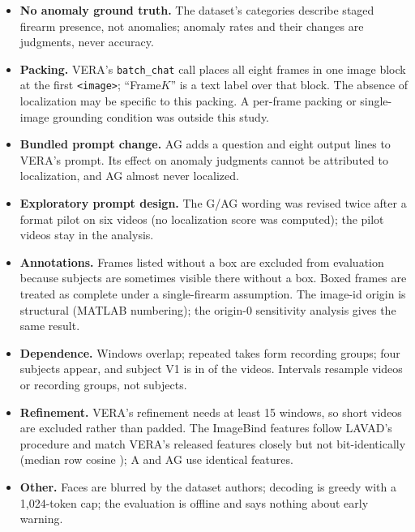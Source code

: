 \begin{itemize}
\item \textbf{No anomaly ground truth.} The dataset's categories describe staged firearm presence, not anomalies; anomaly rates and their changes are judgments, never accuracy.
\item \textbf{Packing.} VERA's \texttt{batch\_chat} call places all eight frames in one image block at the first \texttt{<image>}; ``Frame$K$'' is a text label over that block. The absence of localization may be specific to this packing. A per-frame packing or single-image grounding condition was outside this study.
\item \textbf{Bundled prompt change.} AG adds a question and eight output lines to VERA's prompt. Its effect on anomaly judgments cannot be attributed to localization, and AG almost never localized.
\item \textbf{Exploratory prompt design.} The G/AG wording was revised twice after a format pilot on six videos (no localization score was computed); the pilot videos stay in the analysis.
\item \textbf{Annotations.} Frames listed without a box are excluded from evaluation because subjects are sometimes visible there without a box. Boxed frames are treated as complete under a single-firearm assumption. The image-id origin is structural (MATLAB numbering); the origin-0 sensitivity analysis gives the same result.
\item \textbf{Dependence.} Windows overlap; repeated takes form recording groups; four subjects appear, and subject V1 is in  of the  videos. Intervals resample videos or recording groups, not subjects.
\item \textbf{Refinement.} VERA's refinement needs at least 15 windows, so short videos are excluded rather than padded. The ImageBind features follow LAVAD's procedure and match VERA's released features closely but not bit-identically (median row cosine ); A and AG use identical features.
\item \textbf{Other.} Faces are blurred by the dataset authors; decoding is greedy with a 1,024-token cap; the evaluation is offline and says nothing about early warning.
\end{itemize}
